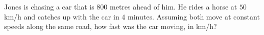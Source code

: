 Jones is chasing a car that is $800$ metres ahead of him. He rides a horse at $50$ km/h and catches up with the car in $4$ minutes. Assuming both move at constant speeds along the same road, how fast was the car moving, in km/h?

